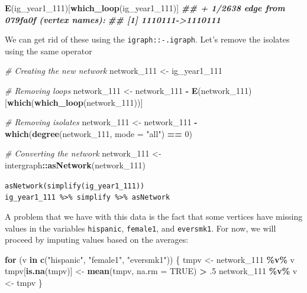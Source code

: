 \documentclass[
]{book}
\newenvironment{Shaded}{\begin{snugshade}}{\end{snugshade}}
\newcommand{\AttributeTok}[1]{\textcolor[rgb]{0.13,0.29,0.53}{#1}}
\newcommand{\CommentTok}[1]{\textcolor[rgb]{0.56,0.35,0.01}{\textit{#1}}}
\newcommand{\ConstantTok}[1]{\textcolor[rgb]{0.56,0.35,0.01}{#1}}
\newcommand{\ControlFlowTok}[1]{\textcolor[rgb]{0.13,0.29,0.53}{\textbf{#1}}}
\newcommand{\DecValTok}[1]{\textcolor[rgb]{0.00,0.00,0.81}{#1}}
\newcommand{\DocumentationTok}[1]{\textcolor[rgb]{0.56,0.35,0.01}{\textbf{\textit{#1}}}}
\newcommand{\FunctionTok}[1]{\textcolor[rgb]{0.13,0.29,0.53}{\textbf{#1}}}
\newcommand{\NormalTok}[1]{#1}
\newcommand{\OtherTok}[1]{\textcolor[rgb]{0.56,0.35,0.01}{#1}}
\newcommand{\SpecialCharTok}[1]{\textcolor[rgb]{0.81,0.36,0.00}{\textbf{#1}}}
\newcommand{\StringTok}[1]{\textcolor[rgb]{0.31,0.60,0.02}{#1}}
\begin{document}
\begin{Shaded}
\begin{Highlighting}[]
\FunctionTok{E}\NormalTok{(ig\_year1\_111)[}\FunctionTok{which\_loop}\NormalTok{(ig\_year1\_111)]}
\DocumentationTok{\#\# + 1/2638 edge from 079fa0f (vertex names):}
\DocumentationTok{\#\# [1] 1110111{-}\textgreater{}1110111}
\end{Highlighting}
\end{Shaded}

We can get rid of these using the \texttt{igraph::-.igraph}. Let's remove the isolates using the same operator

\begin{Shaded}
\begin{Highlighting}[]
\CommentTok{\# Creating the new network}
\NormalTok{network\_111 }\OtherTok{\textless{}{-}}\NormalTok{ ig\_year1\_111}

\CommentTok{\# Removing loops}
\NormalTok{network\_111 }\OtherTok{\textless{}{-}}\NormalTok{ network\_111 }\SpecialCharTok{{-}} \FunctionTok{E}\NormalTok{(network\_111)[}\FunctionTok{which}\NormalTok{(}\FunctionTok{which\_loop}\NormalTok{(network\_111))]}

\CommentTok{\# Removing isolates}
\NormalTok{network\_111 }\OtherTok{\textless{}{-}}\NormalTok{ network\_111 }\SpecialCharTok{{-}} \FunctionTok{which}\NormalTok{(}\FunctionTok{degree}\NormalTok{(network\_111, }\AttributeTok{mode =} \StringTok{"all"}\NormalTok{) }\SpecialCharTok{==} \DecValTok{0}\NormalTok{)}

\CommentTok{\# Converting the network}
\NormalTok{network\_111 }\OtherTok{\textless{}{-}}\NormalTok{ intergraph}\SpecialCharTok{::}\FunctionTok{asNetwork}\NormalTok{(network\_111)}
\end{Highlighting}
\end{Shaded}

\texttt{asNetwork(simplify(ig\_year1\_111))}
\texttt{ig\_year1\_111\ \%\textgreater{}\%\ simplify\ \%\textgreater{}\%\ asNetwork}

A problem that we have with this data is the fact that some vertices have missing values in the variables \texttt{hispanic}, \texttt{female1}, and \texttt{eversmk1}. For now, we will proceed by imputing values based on the averages:

\begin{Shaded}
\begin{Highlighting}[]
\ControlFlowTok{for}\NormalTok{ (v }\ControlFlowTok{in} \FunctionTok{c}\NormalTok{(}\StringTok{"hispanic"}\NormalTok{, }\StringTok{"female1"}\NormalTok{, }\StringTok{"eversmk1"}\NormalTok{)) \{}
\NormalTok{  tmpv }\OtherTok{\textless{}{-}}\NormalTok{ network\_111 }\SpecialCharTok{\%v\%}\NormalTok{ v}
\NormalTok{  tmpv[}\FunctionTok{is.na}\NormalTok{(tmpv)] }\OtherTok{\textless{}{-}} \FunctionTok{mean}\NormalTok{(tmpv, }\AttributeTok{na.rm =} \ConstantTok{TRUE}\NormalTok{) }\SpecialCharTok{\textgreater{}}\NormalTok{ .}\DecValTok{5}
\NormalTok{  network\_111 }\SpecialCharTok{\%v\%}\NormalTok{ v }\OtherTok{\textless{}{-}}\NormalTok{ tmpv}
\NormalTok{\}}
\end{Highlighting}
\end{Shaded}
\end{document}
